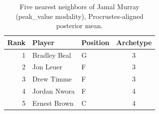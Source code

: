 \begin{table}[htbp]
  \centering\small
  \begin{tabular}{rllc}
    \toprule
    Rank & Player & Position & Archetype \\
    \midrule
    1 & Bradley Beal & G & 3 \\
    2 & Jon Leuer & F & 3 \\
    3 & Drew Timme & F & 3 \\
    4 & Jordan Nwora & F & 4 \\
    5 & Ernest Brown & C & 4 \\
    \bottomrule
  \end{tabular}
  \caption{Five nearest neighbors of Jamal Murray (peak_value modality), Procrustes-aligned posterior mean.}
  \label{tab:Jamal_Murray_neighbors_peak_value}
\end{table}

